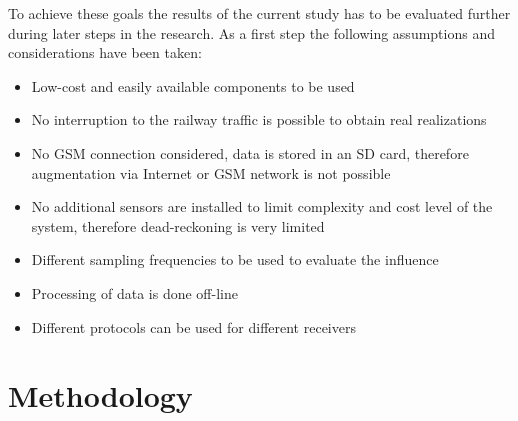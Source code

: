 \documentclass{article}
\begin{document}
		To achieve these goals the results of the current study has to be evaluated further during later steps in the research. As a first step the following assumptions and considerations have been taken:
		\begin{itemize}
			\item Low-cost and easily available components to be used
			\item No interruption to the railway traffic is possible to obtain real realizations
			\item No GSM connection considered, data is stored in an SD card, therefore augmentation via Internet or GSM network is not possible
			\item No additional sensors are installed to limit complexity and cost level of the system, therefore dead-reckoning is very limited
			\item Different sampling frequencies to be used to evaluate the influence
			\item Processing of data is done off-line
			\item Different protocols can be used for different receivers
		\end{itemize}
	\section{Methodology}
\end{document}
